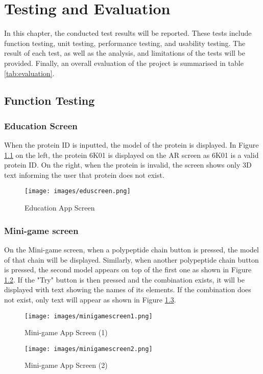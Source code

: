 \chapter{Testing and Evaluation}
\label{ch:evaluation}

In this chapter, the conducted test results will be reported. These tests include function testing, unit testing, performance testing, and usability testing. The result of each test, as well as the analysis, and limitations of the tests will be provided. Finally, an overall evaluation of the project is summarised in table \ref{tab:evaluation}.

\section{Function Testing}
\subsection{Education Screen}
When the protein ID is inputted, the model of the protein is displayed.
In Figure \ref{fig:eduscreen} on the left, the protein 6K01 is displayed on the AR screen as 6K01 is a valid protein ID. On the right, when the protein is invalid, the screen shows only 3D text informing the user that protein does not exist.
 \begin{figure}[!htp]
	\centering
	\texttt{[image: images/eduscreen.png]}
	\caption{Education App Screen}
	\label{fig:eduscreen}
\end{figure}

\subsection{Mini-game screen}
On the Mini-game screen, when a polypeptide chain button is pressed, the model of that chain will be displayed. Similarly, when another polypeptide chain button is pressed, the second model appears on top of the first one as shown in Figure \ref{fig:minigamescreen1}. If the "Try" button is then pressed and the combination exists, it will be displayed with text showing the names of its elements. If the combination does not exist, only text will appear as shown in Figure \ref{fig:minigamescreen2}.
 \begin{figure}[!htp]
	\centering
	\texttt{[image: images/minigamescreen1.png]}
	\caption{Mini-game App Screen (1)}
	\label{fig:minigamescreen1}
\end{figure}

 \begin{figure}[!htp]
	\centering
	\texttt{[image: images/minigamescreen2.png]}
	\caption{Mini-game App Screen (2)}
	\label{fig:minigamescreen2}
\end{figure}

